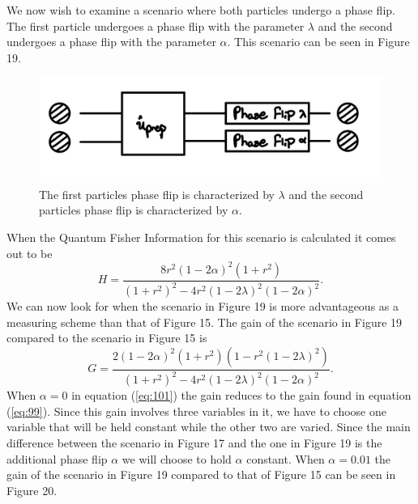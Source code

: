 \documentclass[twocolumn]{article}
\begin{document}
We now wish to examine a scenario where both particles undergo a phase flip. The first particle undergoes a phase flip with the parameter $\lambda$ and the second undergoes a phase flip with the parameter $\alpha$. This scenario can be seen in Figure 19.
\begin{figure}[h]
\begin{center}
\includegraphics[width=0.65\linewidth]{Two-Particle-Phase-Flip-Dual-Channel-Alpha-Lambda-Schematic.jpg}
\caption{The first particles phase flip is characterized by $\lambda$ and the second particles phase flip is characterized by $\alpha$.}
\end{center}
\end{figure}
\newline
When the Quantum Fisher Information for this scenario is calculated it comes out to be
\begin{equation}\label{eq:100}
H=\frac{8r^2(1-2\alpha)^2(1+r^2)}{(1+r^2)^2-4r^2(1-2\lambda)^2(1-2\alpha)^2}.
\end{equation}
We can now look for when the scenario in Figure 19 is more advantageous as a measuring scheme than that of Figure 15. The gain of the scenario in Figure 19 compared to the scenario in Figure 15 is
\begin{equation}\label{eq:101}
G=\frac{2(1-2\alpha)^2(1+r^2)(1-r^2(1-2\lambda)^2)}{(1+r^2)^2-4r^2(1-2\lambda)^2(1-2\alpha)^2}.
\end{equation}
When $\alpha=0$ in equation (\ref{eq:101}) the gain reduces to the gain found in equation (\ref{eq:99}). Since this gain involves three variables in it, we have to choose one variable that will be held constant while the other two are varied. Since the main difference between the scenario in Figure 17 and the one in Figure 19 is the additional phase flip $\alpha$ we will choose to hold $\alpha$ constant. When $\alpha=0.01$ the gain of the scenario in Figure 19 compared to that of Figure 15 can be seen in Figure 20.
\end{document}
